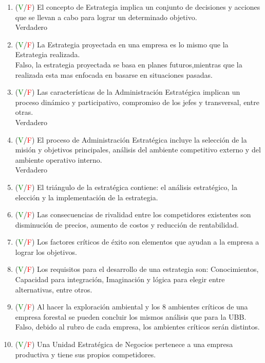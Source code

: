 \documentclass{templateNote}
\begin{document}
\begin{enumerate}
    \item (\textcolor{green}{V}/\textcolor{red}{F}) El concepto de Estrategia implica un conjunto de decisiones y acciones que se llevan a cabo para lograr un determinado objetivo. 
    \\ Verdadero
    \item (\textcolor{green}{V}/\textcolor{red}{F}) La Estrategia proyectada en una empresa es lo mismo que la Estrategia realizada.
    \\ Falso, la estrategia proyectada se basa en planes futuros,mientras que la realizada esta mas enfocada en basarse en situaciones pasadas.
    \item (\textcolor{green}{V}/\textcolor{red}{F}) Las características de la Administración Estratégica implican un proceso dinámico y participativo, compromiso de los jefes y transversal, entre otras.
    \\ Verdadero
    \item (\textcolor{green}{V}/\textcolor{red}{F}) El proceso de Administración Estratégica incluye la selección de la misión y objetivos principales, análisis del ambiente competitivo externo y del ambiente operativo interno.
    \\ Verdadero
    \item (\textcolor{green}{V}/\textcolor{red}{F}) El triángulo de la estratégica contiene: el análisis estratégico, la elección y la implementación de la estrategia.
    \\ 
    \item (\textcolor{green}{V}/\textcolor{red}{F}) Las consecuencias de rivalidad entre los competidores existentes son disminución de precios, aumento de costos y reducción de rentabilidad.
    \\ 
    \item (\textcolor{green}{V}/\textcolor{red}{F}) Los factores críticos de éxito son elementos que ayudan a la empresa a lograr los objetivos. 
    \\ 
    \item (\textcolor{green}{V}/\textcolor{red}{F}) Los requisitos para el desarrollo de una estrategia son: Conocimientos, Capacidad para integración, Imaginación y lógica para elegir entre alternativas, entre otros.
    \\  
    \item (\textcolor{green}{V}/\textcolor{red}{F}) Al hacer la exploración ambiental y los 8 ambientes críticos de una empresa forestal se pueden concluir los mismos análisis que para la UBB. 
    \\ Falso, debido al rubro de cada empresa, los ambientes críticos serán distintos.
    \item (\textcolor{green}{V}/\textcolor{red}{F}) Una Unidad Estratégica de Negocios pertenece a una empresa productiva y tiene sus propios competidores.
    \\ 
\end{enumerate}
\end{document}

